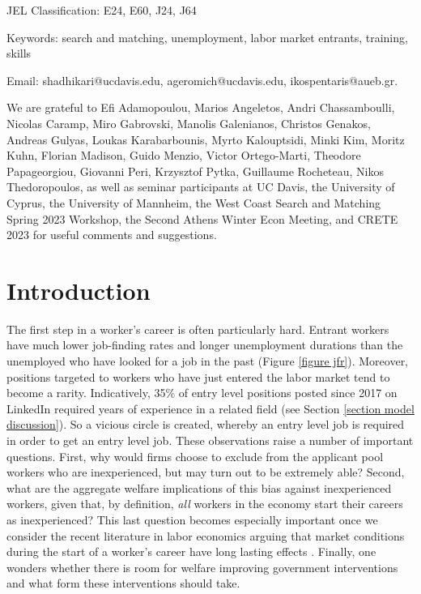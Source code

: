 \documentclass[12pt]{article} %
\theoremstyle{definition}
\begin{document}
\vspace{0.4cm}


\noindent JEL Classification: E24, E60, J24, J64

\noindent Keywords: search and matching, unemployment, labor market entrants, training, skills


\vspace{0.6cm}

\noindent \footnotesize Email: shadhikari@ucdavis.edu, ageromich@ucdavis.edu, ikospentaris@aueb.gr.


\thispagestyle{empty}

\noindent We are grateful to Efi Adamopoulou, Marios Angeletos, Andri Chassamboulli, Nicolas Caramp, Miro Gabrovski, Manolis Galenianos, Christos Genakos, Andreas Gulyas, Loukas Karabarbounis, Myrto Kalouptsidi, Minki Kim, Moritz Kuhn, Florian Madison, Guido Menzio, Victor Ortego-Marti, Theodore Papageorgiou, Giovanni Peri, Krzysztof Pytka, Guillaume Rocheteau, Nikos Thedoropoulos, as well as seminar participants at UC Davis, the University of Cyprus, the University of Mannheim, the West Coast Search and Matching Spring 2023 Workshop, the Second Athens Winter Econ Meeting, and CRETE 2023 for useful comments and suggestions.



\newpage
\setcounter{page}{1}
\normalsize

\section{Introduction}\label{intro} 

    



The first step in a worker's career is often particularly hard. Entrant workers have much lower job-finding rates and longer unemployment durations than the unemployed who have looked for a job in the past (Figure \ref{figure jfr}).
Moreover, positions targeted to workers who have just entered the labor market tend to become a rarity. Indicatively, 35\% of entry level positions posted since 2017 on LinkedIn required years of experience in a related field (see Section \ref{section model discussion}). So a vicious circle is created, whereby an entry level job is required in order to get an entry level job. These observations raise a number of important questions. First, why would firms choose to exclude from the applicant pool workers who are inexperienced, but may turn out to be extremely able? Second, what are the aggregate welfare implications of this bias against inexperienced workers, given that, by definition, \textit{all} workers in the economy start their careers as inexperienced? This last question becomes especially important once we consider the recent literature in labor economics arguing that market conditions during the start of a worker's career have long lasting effects \citep{wachter2020persistent}. Finally, one wonders whether there is room for welfare improving government interventions and what form these interventions should take.  
\end{document}
